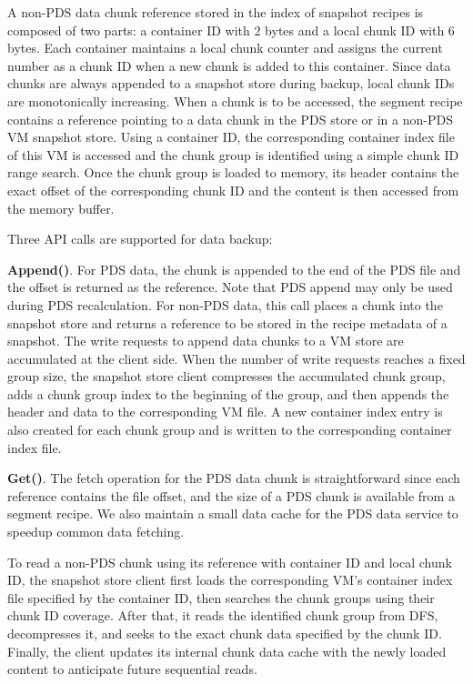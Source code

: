 A non-PDS data chunk reference stored in the index of snapshot recipes
is composed of two parts: a container ID with 2 bytes and a local chunk ID with 6 bytes.
Each container maintains a local  chunk counter and assigns the current number 
as a chunk ID  when  a new chunk is added to this  container. 
Since data chunks are always appended to a snapshot store during backup, 
local chunk IDs are monotonically increasing.
When a chunk is to be accessed, the segment recipe contains a reference pointing to  a data chunk
in the PDS store or in a non-PDS VM snapshot  store. 
Using  a container ID, the corresponding container index file of this VM is accessed and 
the chunk group is identified using a simple chunk ID range search. Once the chunk group is loaded to memory, 
its header contains the exact offset of the corresponding chunk ID and the content is then accessed from the memory buffer.

Three API calls are supported for data backup:

\noindent\textbf{Append()}. 
For PDS data, the chunk is appended to the end of the PDS file and the offset is returned as the  reference.
Note that PDS append may only be used during PDS recalculation.
For non-PDS data, this call places a chunk into 
the snapshot store and returns a reference to be stored in 
the recipe metadata of a snapshot. 
The write requests to append data chunks to a VM store are accumulated at the client side. 
When the number of write requests reaches a fixed group size, the snapshot store client compresses
the accumulated   chunk group, adds a chunk group index  to the beginning of the group, and then
appends the header and data  to the corresponding VM file.
A new container  index entry is also created for each chunk group and is written to the corresponding
container index file.

\noindent\textbf{Get()}.
The fetch operation for the PDS data chunk is straightforward since each reference contains 
the file offset, and the size of a PDS chunk is available from a segment recipe.
We also maintain a small data cache for the PDS data service to speedup common data fetching.

To read a non-PDS chunk using its reference with container ID and local chunk ID,  the snapshot store client first loads the
corresponding VM's container index file specified by the container ID, then searches the chunk
groups  using their  chunk ID coverage.
After that, it reads the identified chunk group from DFS, decompresses it, and seeks to the exact chunk data 
specified by the chunk ID. 
Finally, the client updates its internal chunk data cache with the newly loaded content to 
anticipate future sequential reads.


